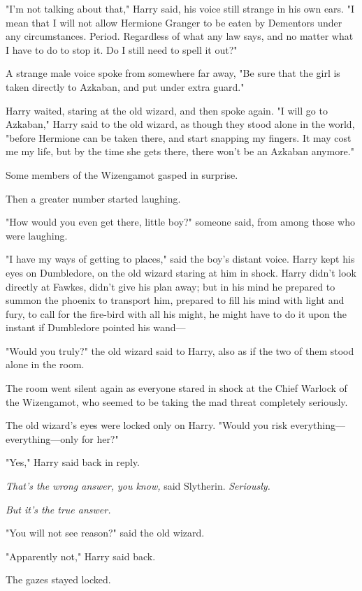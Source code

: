 "I'm not talking about that," Harry said, his voice still strange in his own
ears. "I mean that I will not allow Hermione Granger to be eaten by Dementors
under any circumstances. Period. Regardless of what any law says, and no matter
what I have to do to stop it. Do I still need to spell it out?"

A strange male voice spoke from somewhere far away, "Be sure that the girl is
taken directly to Azkaban, and put under extra guard."

Harry waited, staring at the old wizard, and then spoke again. "I will go to
Azkaban," Harry said to the old wizard, as though they stood alone in the
world, "before Hermione can be taken there, and start snapping my fingers. It
may cost me my life, but by the time she gets there, there won't be an Azkaban
anymore."

Some members of the Wizengamot gasped in surprise.

Then a greater number started laughing.

"How would you even get there, little boy?" someone said, from among those who
were laughing.

"I have my ways of getting to places," said the boy's distant voice. Harry kept his
eyes on Dumbledore, on the old wizard staring at him in shock. Harry didn't
look directly at Fawkes, didn't give his plan away; but in his mind he prepared
to summon the phoenix to transport him, prepared to fill his mind with light
and fury, to call for the fire-bird with all his might, he might have to do it
upon the instant if Dumbledore pointed his wand---

"Would you truly?" the old wizard said to Harry, also as if the two of them
stood alone in the room.

The room went silent again as everyone stared in shock at the Chief Warlock of
the Wizengamot, who seemed to be taking the mad threat completely seriously.

The old wizard's eyes were locked only on Harry. "Would you risk
everything---everything---only for her?"

"Yes," Harry said back in reply.

\emph{That's the wrong answer, you know,} said Slytherin. \emph{Seriously.}

\emph{But it's the true answer.}

"You will not see reason?" said the old wizard.

"Apparently not," Harry said back.

The gazes stayed locked.


